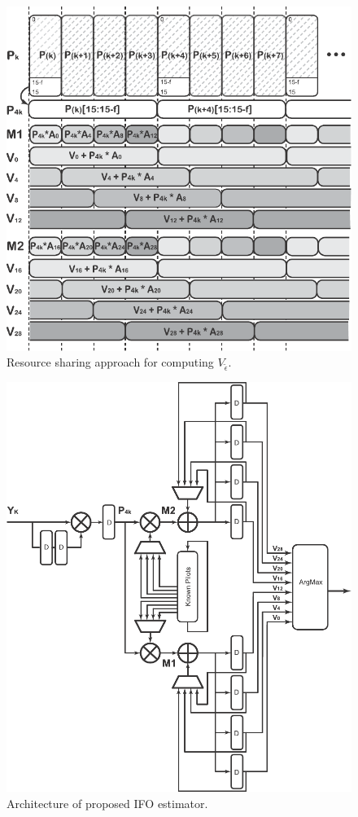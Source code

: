 \begin{figure}
	\centerline{\includegraphics [width=0.8\columnwidth] {figures/Subsampling.pdf} }
	\caption{Resource sharing approach for computing $V_{\tilde{\epsilon}}$.}
	\label{fig:subsampling}
\end{figure}


\begin{figure}
	\centerline{\includegraphics [width=0.8\columnwidth] {figures/ProposedStruc2.pdf} }
	\caption{Architecture of proposed IFO estimator.}
	\label{fig:ProposedStruc}
\end{figure}

